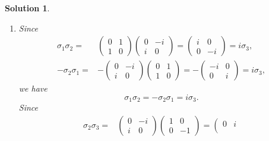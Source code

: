 \documentclass[UTF8,10pt,a4paper]{article}
\theoremstyle{Problem}
\theoremstyle{Solution}
\newtheorem*{sol}{Solution}
\begin{document}
\begin{sol}
\begin{enumerate}
\begin{equation}
\begin{matrix}
                0&1
            \end{matrix}\right).
        \end{equation}
        \item[(b)] Since
        \begin{align}
            \sigma_1\sigma_2=&\left(\begin{matrix}
                0&1\\
                1&0
            \end{matrix}\right)\left(\begin{matrix}
                0&-i\\
                i&0
            \end{matrix}\right)=\left(\begin{matrix}
                i&0\\
                0&-i
            \end{matrix}\right)=i\sigma_3,\\
            -\sigma_2\sigma_1=&-\left(\begin{matrix}
                0&-i\\
                i&0
            \end{matrix}\right)\left(\begin{matrix}
                0&1\\
                1&0
            \end{matrix}\right)=-\left(\begin{matrix}
                -i&0\\
                0&i
            \end{matrix}\right)=i\sigma_3,
        \end{align}
        we have
        \begin{equation}
            \sigma_1\sigma_2=-\sigma_2\sigma_1=i\sigma_3.
        \end{equation}
        Since
        \begin{align}
            \sigma_2\sigma_3=&\left(\begin{matrix}
                0&-i\\
                i&0
            \end{matrix}\right)\left(\begin{matrix}
                1&0\\
                0&-1
            \end{matrix}\right)=\left(\begin{matrix}
                0&i\\

\end{matrix}
\end{align}
\end{enumerate}
\end{sol}
\end{document}
